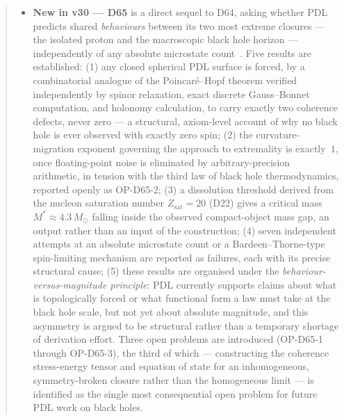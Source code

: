 \documentclass[11pt,a4paper]{article}
\theoremstyle{plain}
\theoremstyle{definition}
\theoremstyle{remark}
\newcommand{\Zsat}{Z_{\mathrm{sat}}}
\begin{document}
\begin{abstract}
\begin{itemize}
\item \textbf{New in v30 --- D65} is a direct sequel to D64, asking whether PDL predicts shared \emph{behaviours} between its two most extreme closures --- the isolated proton and the macroscopic black hole horizon --- independently of any absolute microstate count~\cite{D65}. Five results are established: (1) any closed spherical PDL surface is forced, by a combinatorial analogue of the Poincar\'e--Hopf theorem verified independently by spinor relaxation, exact discrete Gauss--Bonnet computation, and holonomy calculation, to carry exactly two coherence defects, never zero --- a structural, axiom-level account of why no black hole is ever observed with exactly zero spin; (2) the curvature-migration exponent governing the approach to extremality is exactly~$1$, once floating-point noise is eliminated by arbitrary-precision arithmetic, in tension with the third law of black hole thermodynamics, reported openly as OP-D65-2; (3) a dissolution threshold derived from the nucleon saturation number $\Zsat=20$ (D22) gives a critical mass $M^*\approx4.3\,M_\odot$ falling inside the observed compact-object mass gap, an output rather than an input of the construction; (4) seven independent attempts at an absolute microstate count or a Bardeen--Thorne-type spin-limiting mechanism are reported as failures, each with its precise structural cause; (5) these results are organised under the \emph{behaviour-versus-magnitude principle}: PDL currently supports claims about what is topologically forced or what functional form a law must take at the black hole scale, but not yet about absolute magnitude, and this asymmetry is argued to be structural rather than a temporary shortage of derivation effort. Three open problems are introduced (OP-D65-1 through OP-D65-3), the third of which --- constructing the coherence stress-energy tensor and equation of state for an inhomogeneous, symmetry-broken closure rather than the homogeneous limit --- is identified as the single most consequential open problem for future PDL work on black holes.

\end{itemize}
\end{abstract}
\end{document}
